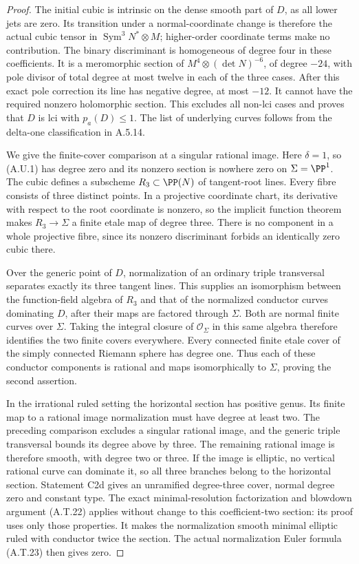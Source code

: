 \begin{proof}
The initial cubic is intrinsic on the dense smooth
part of $D$, as all lower jets are zero. Its
transition under a normal-coordinate change is
therefore the actual cubic tensor in
$\operatorname{Sym}^3N^*\otimes M$; higher-order
coordinate terms make no contribution. The binary
discriminant is homogeneous of degree four in
these coefficients. It is a meromorphic section
of $M^4\otimes(\det N)^{-6}$, of degree $-24$,
with pole divisor of total degree at most twelve
in each of the three cases. After this exact pole
correction its line has negative degree, at most
$-12$. It cannot have the required nonzero
holomorphic section. This excludes all non-lci
cases and proves that $D$ is lci with $p_a(D)\le1$.
The list of underlying curves follows from the
delta-one classification in A.5.14.

We give the finite-cover comparison at a singular
rational image. Here $\delta=1$, so (A.U.1) has
degree zero and its nonzero section is nowhere zero
on $\Sigma=\PP^1$. The cubic defines a subscheme
$R_3\subset\PP(N)$ of tangent-root lines. Every
fibre consists of three distinct points. In a
projective coordinate chart, its derivative with
respect to the root coordinate is nonzero, so the
implicit function theorem makes
$R_3\to\Sigma$ a finite etale map of degree three.
There is no component in a whole projective fibre,
since its nonzero discriminant forbids an identically
zero cubic there.

Over the generic point of $D$, normalization of an
ordinary triple transversal separates exactly its
three tangent lines. This supplies an isomorphism
between the function-field algebra of $R_3$ and
that of the normalized conductor curves dominating
$D$, after their maps are factored through $\Sigma$.
Both are normal finite curves over $\Sigma$.
Taking the integral closure of $\mathcal O_\Sigma$
in this same algebra therefore identifies the two
finite covers everywhere. Every connected finite
etale cover of the simply connected Riemann sphere
has degree one. Thus each of these conductor
components is rational and maps isomorphically to
$\Sigma$, proving the second assertion.

In the irrational ruled setting the horizontal
section has positive genus. Its finite map to a
rational image normalization must have degree at
least two. The preceding comparison excludes a
singular rational image, and the generic triple
transversal bounds its degree above by three.
The remaining rational image is therefore smooth,
with degree two or three. If the image is elliptic,
no vertical rational curve can dominate it, so all
three branches belong to the horizontal section.
Statement C2d gives an unramified degree-three
cover, normal degree zero and constant type.
The exact minimal-resolution factorization and
blowdown argument (A.T.22) applies without change
to this coefficient-two section: its proof uses
only those properties. It makes the normalization
smooth minimal elliptic ruled with conductor twice
the section. The actual normalization Euler formula
(A.T.23) then gives zero.
\end{proof}

